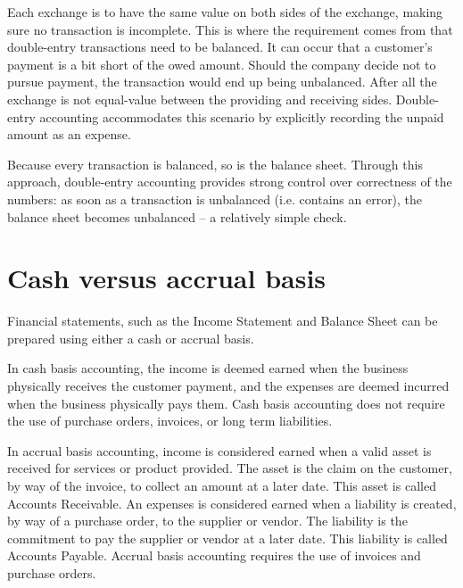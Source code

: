 Each exchange is to have the same value on both sides of the exchange, making sure no transaction is incomplete. This is where
the requirement comes from that double-entry transactions need
to be balanced.  It can occur that a customer's payment is a bit short of the owed amount.  Should the company decide not to pursue payment, the transaction would end up being unbalanced. After all the exchange is not equal-value between the providing and receiving sides. Double-entry accounting accommodates this scenario by explicitly recording the unpaid amount as an expense.

Because every transaction is balanced, so is the balance sheet. Through this approach, double-entry accounting provides strong
control over correctness of the numbers: as soon as a transaction
is unbalanced (i.e. contains an error), the balance sheet becomes unbalanced -- a relatively simple check.

\section{Cash versus accrual basis}
\label{sec-accounting-cash-vs-accrual}

Financial statements, such as the Income Statement and Balance Sheet can be prepared using either a cash or accrual basis.

In \gls{cash basis} accounting, the income is deemed earned when the business physically
receives the customer payment, and the expenses are deemed incurred when the business
physically pays them. Cash basis accounting does not require the use of purchase orders,
invoices, or long term liabilities.

In \gls{accrual basis} accounting, income is considered earned when a valid asset is
received for services or product provided. The asset is the claim on the customer,
by way of the invoice, to collect an amount at a later date. This asset is called
Accounts Receivable. An expenses is considered earned when a liability is created,
by way of a purchase order, to the supplier or vendor. The liability is the commitment
to pay the supplier or vendor at a later date. This liability is called Accounts Payable.
Accrual basis accounting requires the use of invoices and purchase orders.

